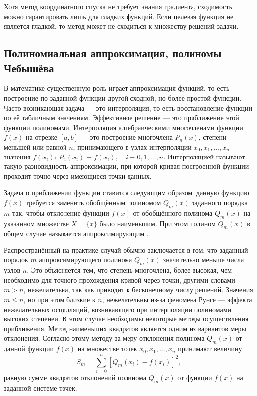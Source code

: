 Хотя метод координатного спуска не требует знания градиента, сходимость можно гарантировать лишь для гладких функций.
Если целевая функция не является гладкой, то метод может не сходиться к множеству решений задачи. 


\subsection{Полиномиальная аппроксимация, полиномы Чебышёва} \label{sect1_4_5}

В математике существенную роль играет аппроксимация функций, то есть построение по заданной функции другой сходной, но более простой функции.
Часто возникающая задача --- это интерполяция, то есть восстановление функции по её табличным значениям.
Эффективное решение --- это приближение этой функции полиномами.
Интерполяция алгебраическими многочленами функции $f(x)$ на отрезке $[a, b]$ — это построение многочлена $P_n(x)$, степени меньшей или равной $n$, принимающего в узлах интерполяции $x_0, x_1, \dots, x_n$ значения $f(x_i)$: $P_{n}(x_{i})=f(x_{i}),\quad i=0, 1, \dots, n$.
Интерполяцией называют такую разновидность аппроксимации, при которой кривая построенной функции проходит точно через имеющиеся точки данных.

Задача о приближении функции ставится следующим образом: данную функцию $f(x)$ требуется заменить обобщённым полиномом $Q_m (x)$ заданного порядка $m$ так, чтобы отклонение функции $f(x)$ от обобщённого полинома $Q_m (x)$ на указанном множестве $X = \{x \}$ было наименьшим.
При этом полином $Q_m (x)$ в общем случае называется аппроксимирующим \cite{demidovich2013numerical}.

Распространённый на практике случай обычно заключается в том, что заданный порядок $m$ аппроксимирующего полинома $Q_m (x)$ значительно меньше числа узлов $n$.
Это объясняется тем, что степень многочлена, более высокая, чем необходимо для точного прохождения кривой через точки, другими словами $m > n$, нежелательна, так как приводит к бесконечному числу решений.
Значения $m \le n$, но при этом близкие к $n$, нежелательны из-за феномена Рунге --- эффекта нежелательных осцилляций, возникающего при интерполяции полиномами высоких степеней.
В этом случае необходимы некоторые методы осуществления приближения.
Метод наименьших квадратов является одним из вариантов меры отклонения.
Согласно этому методу за меру отклонения полинома $Q_m (x)$ от данной функции $f(x)$ на множестве точек $x_0, x_1, \dots, x_n$ принимают величину
\begin{equation}
S_m = \sum_{i=0}^{n} \left[ Q_m (x_i) - f(x_i) \right]^2,
\end{equation}
равную сумме квадратов отклонений полинома $Q_m (x)$ от функции $f(x)$ на заданной системе точек.

